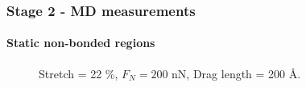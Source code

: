\documentclass[
	10pt, %
]{beamer}
\begin{document}
\begin{frame}
	\frametitle{Stage 2 - MD measurements}
	\framesubtitle{Static non-bonded regions}


	\begin{figure}
		\centering    
		\caption{Stretch = 22 \%, $F_N = 200$ nN, Drag length = 200 Å.}
   \end{figure} 

\end{frame}







	
\end{document}
